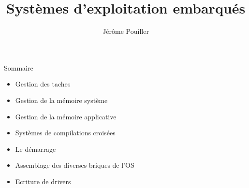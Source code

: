 \documentclass[10pt,ucs,usepdftitle=false]{beamer}
\title{Systèmes d'exploitation embarqués}
\author[Sysmic - J. Pouiller]{Jérôme Pouiller \email{j.pouiller@sysmic.org}}
\institute[Sysmic]{}
\date{}
\begin{document}
  \begin{frame}[plain]
    \maketitle
  \end{frame}


  \begin{frame}{Sommaire}
    \begin{itemize} 
      \item Gestion des taches %
      \item Gestion de la mémoire système %
      \item Gestion de la mémoire applicative %
      \item Systèmes de compilations croisées %
      \item Le démarrage %
      \item Assemblage des diverses briques de l'OS %
      \item Ecriture de drivers %
    \end{itemize} 
  \end{frame}





%





%
%
%
\end{document}
